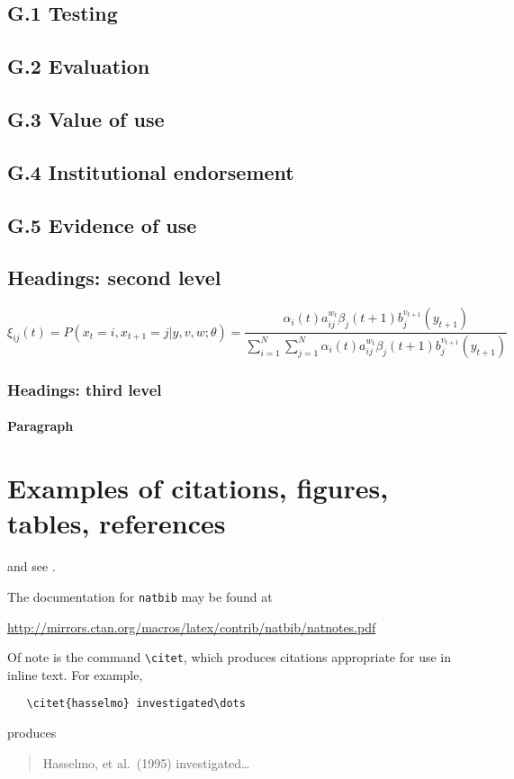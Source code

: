 \documentclass{article}
\begin{document}
\subsection*{G.1 Testing}
\subsection*{G.2 Evaluation}
\subsection*{G.3 Value of use}
\subsection*{G.4 Institutional endorsement}
\subsection*{G.5 Evidence of use}


\subsection{Headings: second level}
\lipsum[5]
\begin{equation}
\xi _{ij}(t)=P(x_{t}=i,x_{t+1}=j|y,v,w;\theta)= {\frac {\alpha _{i}(t)a^{w_t}_{ij}\beta _{j}(t+1)b^{v_{t+1}}_{j}(y_{t+1})}{\sum _{i=1}^{N} \sum _{j=1}^{N} \alpha _{i}(t)a^{w_t}_{ij}\beta _{j}(t+1)b^{v_{t+1}}_{j}(y_{t+1})}}
\end{equation}

\subsubsection{Headings: third level}
\lipsum[6]

\paragraph{Paragraph}
\lipsum[7]

\section{Examples of citations, figures, tables, references}
\label{sec:others}
\lipsum[8] \cite{kour2014real,kour2014fast} and see \cite{hadash2018estimate}.

The documentation for \verb+natbib+ may be found at
\begin{center}
  \url{http://mirrors.ctan.org/macros/latex/contrib/natbib/natnotes.pdf}
\end{center}
Of note is the command \verb+\citet+, which produces citations
appropriate for use in inline text.  For example,
\begin{verbatim}
   \citet{hasselmo} investigated\dots
\end{verbatim}
produces
\begin{quote}
  Hasselmo, et al.\ (1995) investigated\dots
\end{quote}
\end{document}
